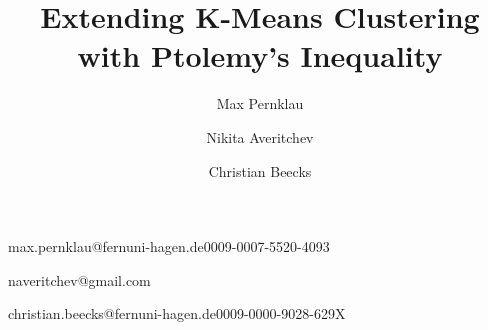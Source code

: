 







\title[Extending K-Means Clustering with Ptolemy’s Inequality]{Extending K-Means Clustering with Ptolemy’s Inequality}
\author[1]{Max Pernklau}{max.pernklau@fernuni-hagen.de}{0009-0007-5520-4093}
\author[1]{Nikita Averitchev}{naveritchev@gmail.com}{}
\author[1]{Christian Beecks}{christian.beecks@fernuni-hagen.de}{0009-0000-9028-629X}



